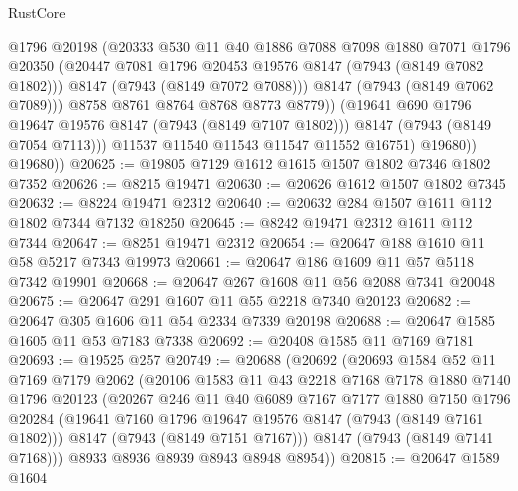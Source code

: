 \begin{lexlean}{RustCore}
\begin{coremodule}
                      @1796
                      @20198
                      (@20333
                        @530
                        @11
                        @40
                        @1886
                        @7088
                        @7098
                        @1880
                        @7071
                        @1796
                        @20350
                        (@20447 @7081 @1796 @20453 @19576 @8147 (@7943 (@8149 @7082 @1802)))
                        @8147
                        (@7943 (@8149 @7072 @7088)))
                      @8147
                      (@7943 (@8149 @7062 @7089)))
                    @8758
                    @8761
                    @8764
                    @8768
                    @8773
                    @8779))
                (@19641 @690 @1796 @19647 @19576 @8147 (@7943 (@8149 @7107 @1802)))
                @8147
                (@7943 (@8149 @7054 @7113)))
              @11537
              @11540
              @11543
              @11547
              @11552
              @16751)
            @19680))
        @19680))
@20625 := @19805 @7129 @1612 @1615 @1507 @1802 @7346 @1802 @7352
@20626 := @8215 @19471
@20630 := @20626 @1612 @1507 @1802 @7345
@20632 := @8224 @19471 @2312
@20640 := @20632 @284 @1507 @1611 @112 @1802 @7344 @7132 @18250
@20645 := @8242 @19471 @2312 @1611 @112 @7344
@20647 := @8251 @19471 @2312
@20654 := @20647 @188 @1610 @11 @58 @5217 @7343 @19973
@20661 := @20647 @186 @1609 @11 @57 @5118 @7342 @19901
@20668 := @20647 @267 @1608 @11 @56 @2088 @7341 @20048
@20675 := @20647 @291 @1607 @11 @55 @2218 @7340 @20123
@20682 := @20647 @305 @1606 @11 @54 @2334 @7339 @20198
@20688 := @20647 @1585 @1605 @11 @53 @7183 @7338
@20692 := @20408 @1585 @11 @7169 @7181
@20693 := @19525 @257
@20749 := @20688
    (@20692
      (@20693
        @1584
        @52
        @11
        @7169
        @7179
        @2062
        (@20106
          @1583
          @11
          @43
          @2218
          @7168
          @7178
          @1880
          @7140
          @1796
          @20123
          (@20267
            @246
            @11
            @40
            @6089
            @7167
            @7177
            @1880
            @7150
            @1796
            @20284
            (@19641 @7160 @1796 @19647 @19576 @8147 (@7943 (@8149 @7161 @1802)))
            @8147
            (@7943 (@8149 @7151 @7167)))
          @8147
          (@7943 (@8149 @7141 @7168)))
        @8933
        @8936
        @8939
        @8943
        @8948
        @8954))
@20815 := @20647
    @1589
    @1604

\end{coremodule}
\end{lexlean}
